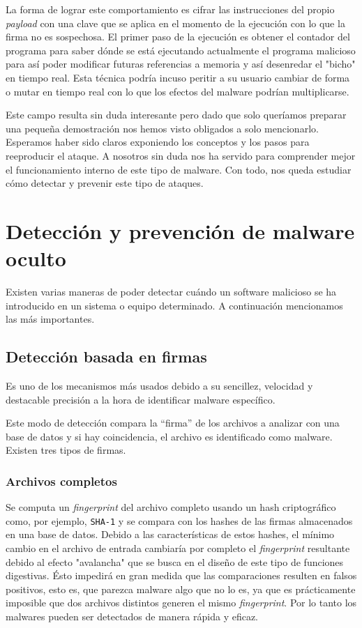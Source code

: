 \documentclass[12pt]{article}
\newcommand{\newpar} {
    \vskip 1cm
}
\begin{document}
                \newpar

                La forma de lograr este comportamiento es cifrar las instrucciones del propio \textit{payload} con una clave que se aplica en el momento de la ejecución con lo que la firma no es sospechosa. El primer paso de la ejecución es obtener el contador del programa para saber dónde se está ejecutando actualmente el programa malicioso para así poder modificar futuras referencias a memoria y así desenredar el "bicho" en tiempo real. Esta técnica podría incuso peritir a su usuario cambiar de forma o mutar en tiempo real con lo que los efectos del malware podrían multiplicarse.

                \newpar

                Este campo resulta sin duda interesante pero dado que solo queríamos preparar una pequeña demostración nos hemos visto obligados a solo mencionarlo. Esperamos haber sido claros exponiendo los conceptos y los pasos para reeproducir el ataque. A nosotros sin duda nos ha servido para comprender mejor el funcionamiento interno de este tipo de malware. Con todo, nos queda estudiar cómo detectar y prevenir este tipo de ataques.

    \section{Detección y prevención de malware oculto}
        Existen varias maneras de poder detectar cuándo un software malicioso se ha introducido en un sistema o equipo determinado. A continuación mencionamos las más importantes.

        \subsection{Detección basada en firmas}
            Es uno de los mecanismos más usados debido a su sencillez, velocidad y destacable precisión a la hora de identificar malware específico.

            Este modo de detección compara la “firma” de los archivos a analizar con una base de datos y si hay coincidencia, el archivo es identificado como malware. Existen tres tipos de firmas.

            \subsubsection{Archivos completos}
                Se computa un \textit{fingerprint} del archivo completo usando un hash criptográfico como, por ejemplo, \texttt{SHA-1} y se compara con los hashes de las firmas almacenados en una base de datos. Debido a las características de estos hashes, el mínimo cambio en el archivo de entrada cambiaría por completo el \textit{fingerprint} resultante debido al efecto "avalancha" que se busca en el diseño de este tipo de funciones digestivas. Ésto impedirá en gran medida que las comparaciones resulten en falsos positivos, esto es, que parezca malware algo que no lo es, ya que es prácticamente imposible que dos archivos distintos generen el mismo \textit{fingerprint}. Por lo tanto los malwares pueden ser detectados de manera rápida y eficaz.
\end{document}
